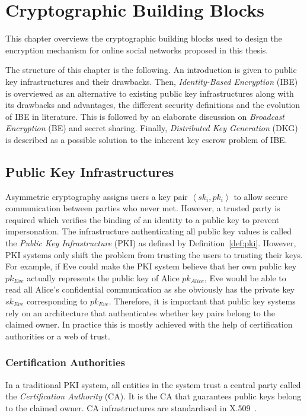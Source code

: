 \chapter{Cryptographic Building Blocks}
\label{cha:2}
This chapter overviews the cryptographic building blocks used to design the encryption mechanism for online social networks proposed in this thesis.

The structure of this chapter is the following. An introduction is given to public key infrastructures and their drawbacks. Then, \textit{Identity-Based Encryption} (IBE) is overviewed as an alternative to existing public key infrastructures along with its drawbacks and advantages, the different security definitions and the evolution of IBE in literature. This is followed by an elaborate discussion on \textit{Broadcast Encryption} (BE) and secret sharing. Finally, \textit{Distributed Key Generation} (DKG) is described as a possible solution to the inherent key escrow problem of IBE.

\section{Public Key Infrastructures}
Asymmetric cryptography assigns users a key pair $\left< sk_i, pk_i \right>$ to allow secure communication between parties who never met. However, a trusted party is required which verifies the binding of an identity to a public key to prevent impersonation. The infrastructure authenticating all public key values is called the \textit{Public Key Infrastructure} (PKI) as defined by Definition~\ref{def:pki}. However, PKI systems only shift the problem from trusting the users to trusting their keys. For example, if Eve could make the PKI system believe that her own public key $pk_{Eve}$ actually represents the public key of Alice $pk_{Alice}$, Eve would be able to read all Alice's confidential communication as she obviously has the private key $sk_{Eve}$ corresponding to $pk_{Eve}$. Therefore, it is important that public key systems rely on an architecture that authenticates whether key pairs belong to the claimed owner. In practice this is mostly achieved with the help of certification authorities or a web of trust.

\subsection{Certification Authorities}
In a traditional PKI system, all entities in the system trust a central party called the \textit{Certification Authority} (CA). It is the CA that guarantees public keys belong to the claimed owner. CA infrastructures are standardised in X.509~\cite{rfc4158}.

